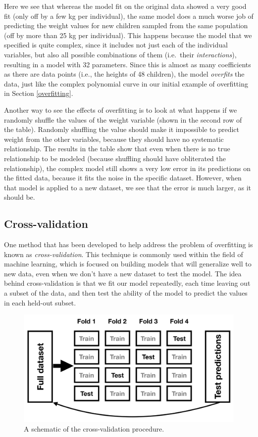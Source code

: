 \documentclass[12pt,]{book}
\theoremstyle{definition}
\theoremstyle{definition}
\theoremstyle{definition}
\theoremstyle{remark}
\begin{document}
Here we see that whereas the model fit on the original data showed a very good fit (only off by a few kg per individual), the same model does a much worse job of predicting the weight values for new children sampled from the same population (off by more than 25 kg per individual). This happens because the model that we specified is quite complex, since it includes not just each of the individual variables, but also all possible combinations of them (i.e.~their \emph{interactions}), resulting in a model with 32 parameters. Since this is almost as many coefficients as there are data points (i.e., the heights of 48 children), the model \emph{overfits} the data, just like the complex polynomial curve in our initial example of overfitting in Section \ref{overfitting}.

Another way to see the effects of overfitting is to look at what happens if we randomly shuffle the values of the weight variable (shown in the second row of the table). Randomly shuffling the value should make it impossible to predict weight from the other variables, because they should have no systematic relationship. The results in the table show that even when there is no true relationship to be modeled (because shuffling should have obliterated the relationship), the complex model still shows a very low error in its predictions on the fitted data, because it fits the noise in the specific dataset. However, when that model is applied to a new dataset, we see that the error is much larger, as it should be.

\hypertarget{cross-validation}{%
\subsection{Cross-validation}\label{cross-validation}}

One method that has been developed to help address the problem of overfitting is known as \emph{cross-validation}. This technique is commonly used within the field of machine learning, which is focused on building models that will generalize well to new data, even when we don't have a new dataset to test the model. The idea behind cross-validation is that we fit our model repeatedly, each time leaving out a subset of the data, and then test the ability of the model to predict the values in each held-out subset.

\begin{figure}
\includegraphics[width=45.74in,height=0.3\textheight]{images/crossvalidation} \caption{A schematic of the  cross-validation procedure.}\label{fig:crossvalidation}
\end{figure}
\end{document}
